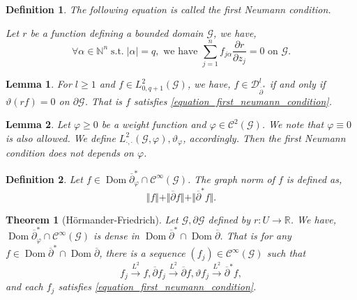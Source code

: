 \documentclass{article}
\newtheorem{theorem}{Theorem} [section]
\newtheorem{definition}{Definition}[section]
\newtheorem{lemma}{Lemma}[section]
\DeclareMathOperator{\st}{s.t.}
\DeclareMathOperator{\Dom}{Dom}
\newcommand{\norm}[1]{\Vert #1 \Vert}
\newcommand{\N}[0]{\mathbb{N}}
\newcommand{\R}[0]{\mathbb{R}}
\newcommand{\G}[0]{\mathcal{G}}
\newcommand{\pd}[2]{{\frac {\partial#1} {\partial#2}}}
\newcommand{\bd}[0]{\partial}
\newcommand{\cbd}[0]{\overline{\partial}}
\newcommand{\ck}[1]{\mathcal{C}^{#1}}
\newcommand{\cinf}[0]{\ck{\infty}}
\begin{document}
  \begin{definition}
    The following equation is called the first Neumann condition.
    \par Let $r$ be a function defining a bounded domain $\G$, we have,
    \begin{equation*}
      \forall\alpha\in\N^{n}\st\vert\alpha\vert=q,\text{ we have } \sum_{j=1}^n f_{j\alpha}\pd{r}{z_j}=0\text{ on $\G$}.\tag{N1}\label{equation_first_neumann_condition}
    \end{equation*}
  \end{definition}

  \begin{lemma}
    For $l\geq1$ and $f\in L_{0,q+1}^2(\G)$, we have, $f\in\mathcal{D}_{\cbd^*}^l$ if and only if $\vartheta(rf)=0$ on $\bd\G$. That is $f$ satisfies \eqref{equation_first_neumann_condition}.
  \end{lemma}

  \begin{lemma}
    Let $\varphi\geq0$ be a weight function and $\varphi\in\mathcal{C}^2(\G)$. We note that $\varphi\equiv0$ is also allowed. We define $L_{\cdot,\cdot}^2(\G,\varphi),\vartheta_\varphi$, accordingly. Then the first Neumann condition does not depends on $\varphi$.
  \end{lemma}

  \begin{definition}
    Let $f\in\Dom\cbd^*_\varphi\cap\cinf(\G)$. The graph norm of $f$ is defined as,
    \begin{equation*}
      \norm{f}+\norm{\cbd f}+\norm{\cbd^* f}.
    \end{equation*}
  \end{definition}

  \begin{theorem}[Hörmander-Friedrich]
    Let $\G,\bd\G$ defined by $r:U\to\R$. We have, $\Dom\cbd^*_\varphi\cap\cinf(\G)$ is dense in $\Dom\cbd^*\cap\Dom\cbd$. That is for any $f\in \Dom\cbd^*\cap\Dom\cbd$, there is a sequence $(f_j)\in\cinf(\G)$ such that 
    \begin{equation*}
      f_j\stackrel{L^2}{\to}f,\cbd f_j\stackrel{L^2}{\to}\cbd f,\vartheta f_j\stackrel{L^2}{\to}\cbd^*f,
    \end{equation*}
    and each $f_j$ satisfies \eqref{equation_first_neumann_condition}. 
  \end{theorem}
\end{document}
